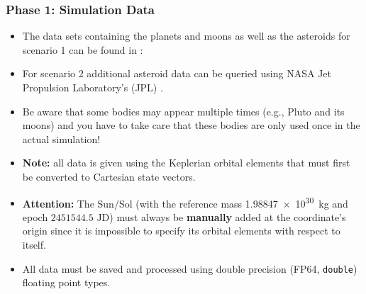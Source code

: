 \begin{frame}
    \frametitle{Phase 1: Simulation Data}
    \begin{itemize}
        \item The data sets containing the planets and moons as well as the asteroids for scenario 1 can be found in :
        \item For scenario 2 additional asteroid data can be queried using NASA Jet Propulsion Laboratory's (JPL) .
        \item Be aware that some bodies may appear multiple times (e.g., Pluto and its moons) and you have to take care that these bodies are only used once in the actual simulation!

        \item \textbf{Note:} all data is given using the Keplerian orbital elements that must first be converted to Cartesian state vectors.

        \item \textbf{Attention:} The Sun/Sol (with the reference mass \SI{1.98847e30}{\kilo\gram} and epoch $2451544.5$ JD) must always be \textbf{manually} added at the coordinate's origin since it is impossible to specify its orbital elements with respect to itself.

        \item All data must be saved and processed using double precision (FP64, \texttt{double}) floating point types.
    \end{itemize}
\end{frame}


